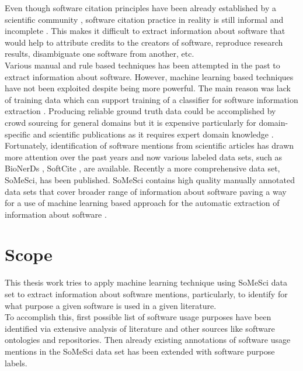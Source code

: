 Even though software citation principles have been already established by a scientific community \citep{callaghan2014joint, smith2016software}, software citation practice in reality  is still informal and incomplete \citep{schindler2021somesci}. This makes it difficult to extract information about software that would help to attribute credits to the creators of software, reproduce research results, disambiguate one software from another, etc. \\

Various manual and rule based techniques has been attempted in the past to extract information about software. However, machine learning based techniques have not been exploited despite being more powerful. The main reason was lack of training data which can support training of a classifier for software information extraction \citep{schindler2021somesci}. Producing reliable ground truth data could be accomplished by crowd sourcing for general domains but it is expensive particularly for domain-specific and scientific publications as it requires expert domain knowledge \citep{beltagy2019scibert}. Fortunately, identification of software mentions from scientific articles has drawn more attention over the past years and now various labeled data sets, such as BioNerDs \citep{duck2013bionerds} , SoftCite \citep{du2021softcite}, are available. Recently a more comprehensive data set, SoMeSci, has been published.  SoMeSci contains high quality manually annotated data sets that cover broader range of information about software paving a way for a use of machine learning based approach for the automatic extraction of information about software \citep{schindler2021somesci}. 



\section{Scope}
\label{sec:intro:Scope}

This thesis work tries to apply machine learning technique using SoMeSci data set to extract information about software mentions, particularly, to identify for what purpose a given software is used in a given literature. \\

To accomplish this, first possible list of software usage purposes have been identified via extensive analysis of literature and other sources like software ontologies and repositories. Then already existing annotations of software usage mentions in the SoMeSci data set has been extended with software purpose labels. \\

